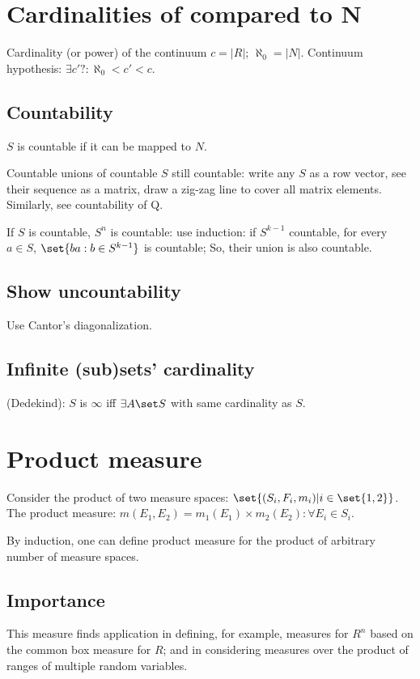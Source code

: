 \documentclass[oneside, article]{memoir}
\begin{document}
\section{Cardinalities of compared to N}
Cardinality (or power) of the continuum $c = |R|$; $\aleph_{0} = |N|$. Continuum hypothesis: $\exists c'?: \aleph_{0}< c'<c$.

\subsection{Countability}
$S$ is countable if it can be mapped to $N$.

Countable unions of countable $S$ still countable: write any $S$ as a row vector, see their sequence as a matrix, draw a zig-zag line to cover all matrix elements. Similarly, see countability of Q.

If $S$ is countable, $S^{n}$ is countable: use induction: if $S^{k-1}$ countable, for every $a\in S$, $\set{ba: b\in S^{k-1}}$ is countable; So, their union is also countable.

\subsection{Show uncountability}
Use Cantor's diagonalization.

\subsection{Infinite (sub)sets' cardinality}
(Dedekind): $S$ is $\infty$ iff $\exists A\set S$ with same cardinality as $S$. 

\section{Product measure}
Consider the product of two measure spaces: $\set{(S_i, F_i, m_i) | i \in \set{1, 2}}$. The product measure: $m(E_1, E_2) = m_1(E_1) \times m_2(E_2) : \forall E_i \in S_i$.

By induction, one can define product measure for the product of arbitrary number of measure spaces.

\subsection{Importance}
This measure finds application in defining, for example, measures for $R^{n}$ based on the common box measure for $R$; and in considering measures over the product of ranges of multiple random variables.
\end{document}
